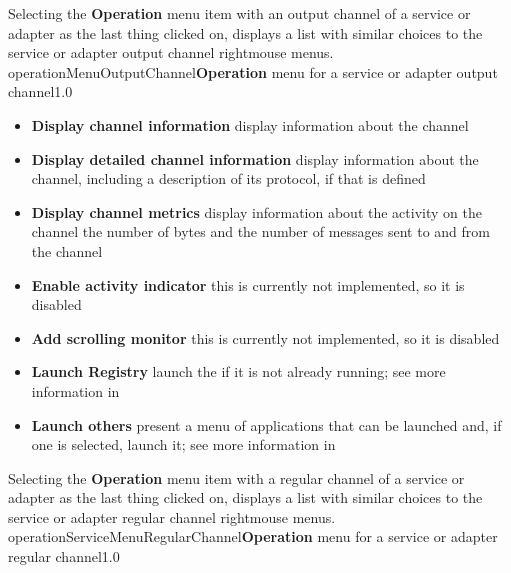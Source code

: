 \condPage{}
Selecting the \textbf{Operation} menu item with an output channel of a service or adapter
as the last thing clicked on, displays a list with similar choices to the service or
adapter output channel right\longDash{}mouse menus.\\
%
{operationMenuOutputChannel}{\textbf{Operation} menu for a service or adapter output
channel}{1.0}
\begin{itemize}
\item\textbf{Display channel information} display information about the channel
\item\exSp\textbf{Display detailed channel information} display information about the
channel, including a description of its protocol, if that is defined
\item\exSp\textbf{Display channel metrics} display information about the activity on the
channel \longDash{} the number of bytes and the number of messages sent to and from the
channel
\item\exSp\textbf{Enable activity indicator} \longDash{} this is currently not
implemented, so it is disabled
\item\exSp\textbf{Add scrolling monitor} \longDash{} this is currently not implemented, so
it is disabled
\item\exSp\textbf{Launch Registry} launch the \emph{\RS} if it is not already running; see
more information in\\
\item\exSp\textbf{Launch others \textellipsis} present a menu of applications that can be
launched and, if one is selected, launch it; see more information in
\end{itemize}
\condPage{}
Selecting the \textbf{Operation} menu item with a regular channel of a service or adapter
as the last thing clicked on, displays a list with similar choices to the service or
adapter regular channel right\longDash{}mouse menus.\\
%
{operationServiceMenuRegularChannel}{\textbf{Operation} menu for a service or adapter
regular channel}{1.0}
